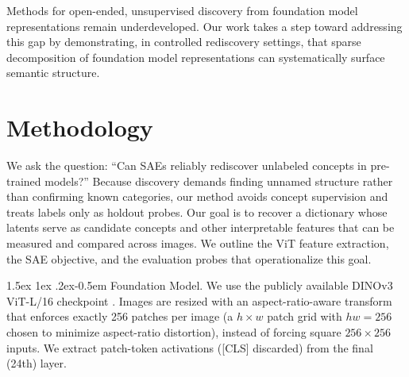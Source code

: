 \documentclass[runningheads]{llncs}
\makeatletter
\renewcommand{\paragraph}{%
  \@startsection{paragraph}{4}%
  {\z@}{1.5ex \@plus 1ex \@minus .2ex}{-0.5em}%
  {\normalfont\normalsize\bfseries}%
}
\makeatother
\begin{document}
Methods for open-ended, unsupervised discovery from foundation model representations remain underdeveloped.
Our work takes a step toward addressing this gap by demonstrating, in controlled rediscovery settings, that sparse decomposition of foundation model representations can systematically surface semantic structure.

\section{Methodology}

We ask the question: ``Can SAEs reliably rediscover unlabeled concepts in pre-trained models?''
Because discovery demands finding unnamed structure rather than confirming known categories, our method avoids concept supervision and treats labels only as holdout probes.
Our goal is to recover a dictionary whose latents serve as candidate concepts and other interpretable features that can be measured and compared across images.
We outline the ViT feature extraction, the SAE objective, and the evaluation probes that operationalize this goal.

\paragraph{Foundation Model.} We use the publicly available DINOv3 ViT-L/16 checkpoint \citep{simeoni2025dinov3}.
Images are resized with an aspect-ratio-aware transform that enforces exactly \num{256} patches per image (a $h\times w$ patch grid with $hw=256$ chosen to minimize aspect-ratio distortion), instead of forcing square $256\times256$ inputs.
We extract patch-token activations ([CLS] discarded) from the final (24th) layer. 
\end{document}
